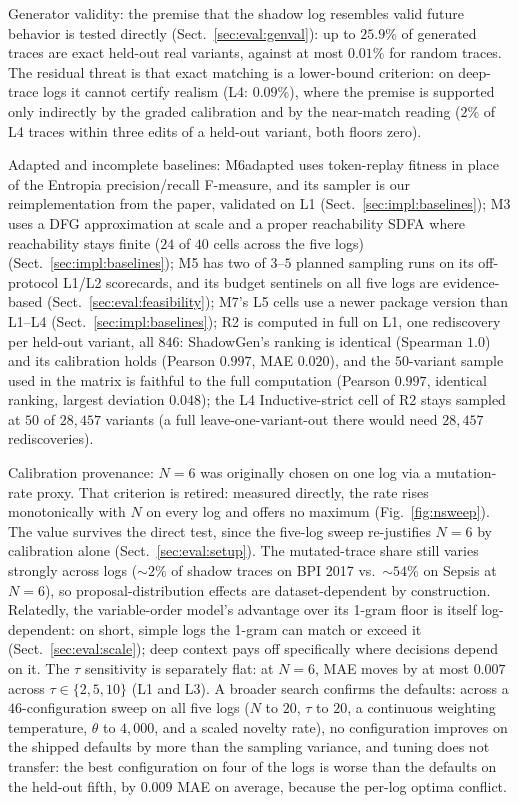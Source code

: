 \documentclass[runningheads]{llncs}
\newcommand{\chg}[1]{#1}
\begin{document}
\chg{Generator validity: the premise that the shadow log resembles valid future behavior is tested directly (Sect.~\ref{sec:eval:genval}): up to $25.9\%$ of generated traces are exact held-out real variants, against at most $0.01\%$ for random traces. The residual threat is that exact matching is a lower-bound criterion: on deep-trace logs it cannot certify realism (L4: $0.09\%$), where the premise is supported only indirectly by the graded calibration and by the near-match reading ($2\%$ of L4 traces within three edits of a held-out variant, both floors zero).}

Adapted and incomplete baselines: M6adapted uses token-replay fitness in place of the Entropia precision/recall F-measure\chg{, and its sampler is our reimplementation from the paper, validated on L1} (Sect.~\ref{sec:impl:baselines}); M3 uses a DFG approximation \chg{at scale and a proper reachability SDFA where reachability stays finite ($24$ of $40$ cells across the five logs)} (Sect.~\ref{sec:impl:baselines}); M5 has two of $3$--$5$ planned sampling runs \chg{on its off-protocol L1/L2 scorecards, and its budget sentinels on all five logs are evidence-based (Sect.~\ref{sec:eval:feasibility})}; \chg{M7's L5 cells use a newer package version than L1--L4 (Sect.~\ref{sec:impl:baselines})}; \chg{R2 is computed in full on L1, one rediscovery per held-out variant, all $846$: ShadowGen's ranking is identical (Spearman $1.0$) and its calibration holds (Pearson $0.997$, MAE $0.020$), and the $50$-variant sample used in the matrix is faithful to the full computation (Pearson $0.997$, identical ranking, largest deviation $0.048$); the L4 Inductive-strict cell of R2 stays sampled at $50$ of $28{,}457$ variants (a full leave-one-variant-out there would need $28{,}457$ rediscoveries)}.

Calibration provenance: $N{=}6$ was originally chosen on one log via a mutation-rate proxy. That criterion is retired: measured directly, the rate rises monotonically with $N$ on every log and offers no maximum (Fig.~\ref{fig:nsweep}). The value survives the direct test, since the five-log sweep re-justifies $N{=}6$ by calibration alone (Sect.~\ref{sec:eval:setup}). The mutated-trace share still varies strongly across logs ($\sim2\%$ of shadow traces on BPI 2017 vs.\ $\sim54\%$ on Sepsis at $N{=}6$), so proposal-distribution effects are dataset-dependent by construction. \chg{Relatedly, the variable-order model's advantage over its 1-gram floor is itself log-dependent: on short, simple logs the 1-gram can match or exceed it (Sect.~\ref{sec:eval:scale}); deep context pays off specifically where decisions depend on it.} \chg{The $\tau$ sensitivity is separately flat: at $N{=}6$, MAE moves by at most $0.007$ across $\tau\in\{2,5,10\}$ (L1 and L3).} \chg{A broader search confirms the defaults: across a $46$-configuration sweep on all five logs ($N$ to $20$, $\tau$ to $20$, a continuous weighting temperature, $\theta$ to $4{,}000$, and a scaled novelty rate), no configuration improves on the shipped defaults by more than the sampling variance, and tuning does not transfer: the best configuration on four of the logs is worse than the defaults on the held-out fifth, by $0.009$ MAE on average, because the per-log optima conflict.}
\end{document}
